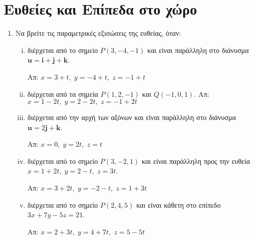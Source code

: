 



\geometry{top=2cm}
\pagestyle{askhseis}
\everymath{\displaystyle}




\begin{center}
  \minibox{\large\bf \textcolor{Col1}{Ασκήσεις στις ευθείες και τα επίπεδα}}
\end{center}


\section*{Ευθείες και Επίπεδα στο χώρο}


\begin{enumerate}
  \item Να βρείτε τις παραμετρικές εξισώσεις της ευθείας, όταν:
    \begin{enumerate}[i)]
      \item διέρχεται από το σημείο $ P(3,-4,-1) $ και είναι παράλληλη στο διάνυσμα 
        $ \mathbf{u} = \mathbf{i}+ \mathbf{j}+ \mathbf{k} $. 

        \hfill Απ: $ x=3+t, \; y=-4+t, \; z=-1+t $

      \item διέρχεται από τα σημεία $ P(1,2,-1) $ και $ Q(-1,0,1) $.
        \hfill Απ: $ x=1-2t, \; y=2-2t, \; z=-1+2t $ 


      \item διέρχεται από την αρχή των αξόνων και είναι παράλληλη στο διάνυσμα 
        $ \mathbf{u} = 2 \mathbf{j}+ \mathbf{k} $.

        \hfill Απ: $ x=0, \; y=2t, \; z=t $ 

      \item διέρχεται από το σημείο $ P(3,-2,1) $ και είναι παράλληλη προς την ευθεία 
        $ x=1+2t, \; y=2-t, \; z=3t $.

        \hfill Απ: $ x=3+2t, \; y=-2-t, \; z=1+3t $ 

      \item διέρχεται από το σημείο $ P(2,4,5) $ και είναι κάθετη στο επίπεδο 
        $ 3x+7y-5z=21 $.

        \hfill Απ: $ x=2+3t, \; y=4+7t, \; z=5-5t $ 


\end{enumerate}
\end{enumerate}
